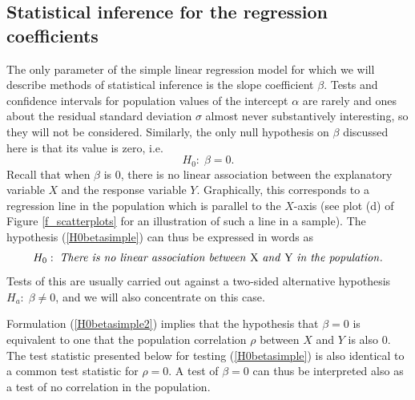 \subsection{Statistical inference for the regression coefficients}
\label{ss_regression_simple_inf}

The only parameter of the simple linear regression model for which we
will describe methods of statistical inference is the slope coefficient
$\beta$.
Tests and confidence intervals for
population values of the intercept $\alpha$
are rarely and ones about the residual standard deviation $\sigma$
almost never substantively interesting, so they will not be considered.
Similarly, the only null hypothesis on $\beta$ discussed here is that
its value is zero, i.e.\
\begin{equation}
H_{0}:\; \beta=0.
\label{H0betasimple}
\end{equation}
Recall that when $\beta$ is 0, there is
no linear association between
the explanatory
variable $X$ and the response variable $Y$.
Graphically, this
corresponds to a regression line in the population which is
parallel to the $X$-axis (see plot (d) of Figure
\ref{f_scatterplots} for an illustration of such a line in a sample).
The hypothesis (\ref{H0betasimple}) can thus be expressed in words as
\begin{equation}
H_{0}:\; \text{\emph{There is no
linear association
between }X \text{\emph{and} }Y\text{ \emph{in the population}}}.
\label{H0betasimple2}
\end{equation}
Tests of this are usually carried out against a two-sided alternative
hypothesis $H_{a}: \; \beta\ne 0$, and we will also concentrate on this
case.

Formulation (\ref{H0betasimple2}) implies that the hypothesis that
$\beta=0$ is equivalent to one that the population correlation $\rho$
between $X$ and $Y$ is also 0. The test statistic presented below for
testing (\ref{H0betasimple}) is also identical to a common test
statistic for $\rho=0$. A test of $\beta=0$ can thus be interpreted also
as a test of no correlation in the population.

